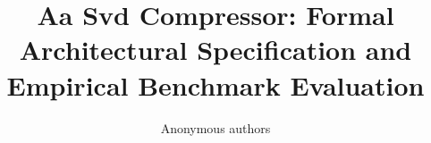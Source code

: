 \title{\textbf{Aa Svd Compressor: Formal Architectural Specification and Empirical Benchmark Evaluation}}

\author{Anonymous authors}
